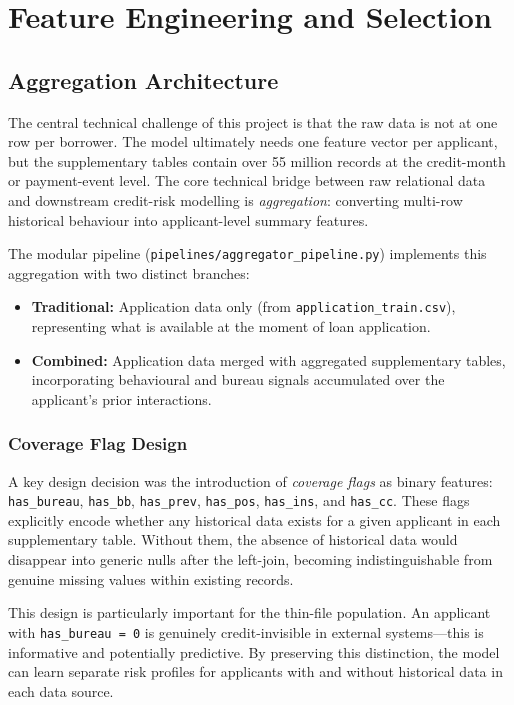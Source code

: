 \chapter{Feature Engineering and Selection}
\label{chap:feature_engineering}

\section{Aggregation Architecture}
\label{sec:aggregation}

The central technical challenge of this project is that the raw data is not at one row per borrower. The model ultimately needs one feature vector per applicant, but the supplementary tables contain over 55 million records at the credit-month or payment-event level. The core technical bridge between raw relational data and downstream credit-risk modelling is \textit{aggregation}: converting multi-row historical behaviour into applicant-level summary features.

The modular pipeline (\texttt{pipelines/aggregator\_pipeline.py}) implements this aggregation with two distinct branches:

\begin{itemize}
    \item \textbf{Traditional:} Application data only (from \texttt{application\_train.csv}), representing what is available at the moment of loan application.
    \item \textbf{Combined:} Application data merged with aggregated supplementary tables, incorporating behavioural and bureau signals accumulated over the applicant's prior interactions.
\end{itemize}

\subsection{Coverage Flag Design}

A key design decision was the introduction of \textit{coverage flags} as binary features: \texttt{has\_bureau}, \texttt{has\_bb}, \texttt{has\_prev}, \texttt{has\_pos}, \texttt{has\_ins}, and \texttt{has\_cc}. These flags explicitly encode whether any historical data exists for a given applicant in each supplementary table. Without them, the absence of historical data would disappear into generic nulls after the left-join, becoming indistinguishable from genuine missing values within existing records.

This design is particularly important for the thin-file population. An applicant with \texttt{has\_bureau = 0} is genuinely credit-invisible in external systems---this is informative and potentially predictive. By preserving this distinction, the model can learn separate risk profiles for applicants with and without historical data in each data source.

